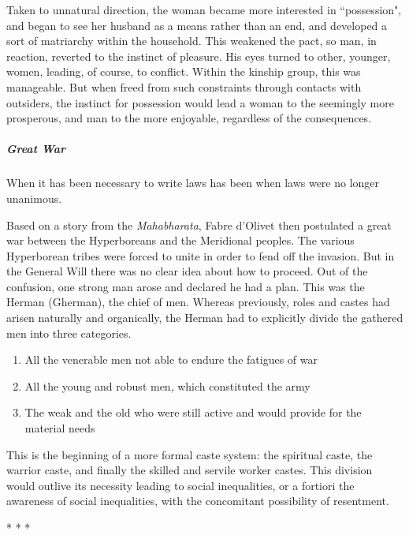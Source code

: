 Taken to unnatural direction, the woman became more interested in ``possession", and began to see her husband as a means rather than an end, and developed a sort of matriarchy within the household. This weakened the pact, so man, in reaction, reverted to the instinct of pleasure. His eyes turned to other, younger, women, leading, of course, to conflict. Within the kinship group, this was manageable. But when freed from such constraints through contacts with outsiders, the instinct for possession would lead a woman to the seemingly more prosperous, and man to the more enjoyable, regardless of the consequences.

\subparagraph{Great War}
\begin{quotex}
When it has been necessary to write laws has been when laws were no longer unanimous.


\end{quotex}
Based on a story from the \emph{Mahabharata}, Fabre d'Olivet then postulated a great war between the Hyperboreans and the Meridional peoples. The various Hyperborean tribes were forced to unite in order to fend off the invasion. But in the General Will there was no clear idea about how to proceed. Out of the confusion, one strong man arose and declared he had a plan. This was the Herman (Gherman), the chief of men. Whereas previously, roles and castes had arisen naturally and organically, the Herman had to explicitly divide the gathered men into three categories.

\begin{enumerate}
\item All the venerable men not able to endure the fatigues of war 
\item All the young and robust men, which constituted the army 
\item The weak and the old who were still active and would provide for the material needs 
\end{enumerate}
This is the beginning of a more formal caste system: the spiritual caste, the warrior caste, and finally the skilled and servile worker castes. This division would outlive its necessity leading to social inequalities, or a fortiori the awareness of social inequalities, with the concomitant possibility of resentment.




\begin{center}* * *\end{center}

